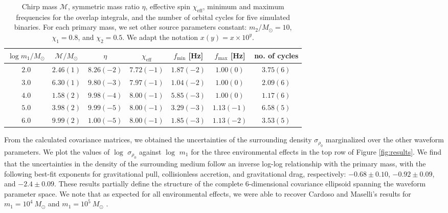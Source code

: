 \documentclass[10pt,a4paper,twoside]{article}
\begin{document}
\begin{table}[bp!]
\centering %
\caption{Chirp mass $\mathcal{M}$, symmetric mass ratio $\eta$, effective spin $\chi_{\text{eff}}$, minimum and maximum frequencies for the overlap integrals, and the number of orbital cycles for five simulated binaries. For each primary mass, we set other source parameters constant: $m_2/M_{\odot} = 10$, $\chi_1 = 0.8$, and $\chi_2 = 0.5$. We adapt the notation $x(y) = x \times 10^y$.}\label{table:binaryparams}
\begin{tabular}{c| c c c c c c}
\toprule
$\log m_1/M_{\odot}$ & $\mathcal{M}/M_{\odot}$ & $\eta$ & $\chi_{\text{eff}}$ & $f_{\text{min}}$ [Hz] & $f_{\text{max}}$ [Hz] & no. of cycles \\
\midrule
$2.0$ & $2.46(1)$ & $8.26(-2)$ & $7.72(-1)$ & $1.87(-2)$ & $1.00(0)$ & $3.75(6)$ \\
$3.0$ & $6.30(1)$ & $9.80(-3)$ & $7.97(-1)$ & $1.04(-2)$ & $1.00(0)$ & $2.09(6)$ \\
$4.0$ & $1.58(2)$ & $9.98(-4)$ & $8.00(-1)$ & $5.85(-3)$ & $1.00(0)$ & $1.17(6)$ \\
$5.0$ & $3.98(2)$ & $9.99(-5)$ & $8.00(-1)$ & $3.29(-3)$ & $1.13(-1)$ & $6.58(5)$ \\
$6.0$ & $9.99(2)$ & $1.00(-5)$ & $8.00(-1)$ & $1.85(-3)$ & $1.13(-2)$ & $3.53(5)$ \\
\bottomrule
\end{tabular}
\end{table}


From the calculated covariance matrices, we obtained the uncertainties of the surrounding density $\sigma_{\rho_0}$ marginalized over the other waveform parameters. We plot the values of $\log$ $\sigma_{\rho_0}$ against $\log$ $m_1$ for the three environmental effects in the top row of Figure \ref{fig:results}. We find that the uncertainties in the density of the surrounding medium follow an inverse log-log relationship with the primary mass, with the following best-fit exponents for gravitational pull, collisionless accretion, and gravitational drag, respectively: $-0.68 \pm 0.10$, $-0.92 \pm 0.09$, and $-2.4 \pm 0.09$. These results partially define the structure of the complete 6-dimensional covariance ellipsoid spanning the waveform parameter space. We note that as expected for all environmental effects, we were able to recover Cardoso and Maselli's results for $m_1 = 10^4 ~M_{\odot}$ and $m_1 = 10^5 ~M_{\odot}$ \cite{Cardoso2020}. 
\end{document}
